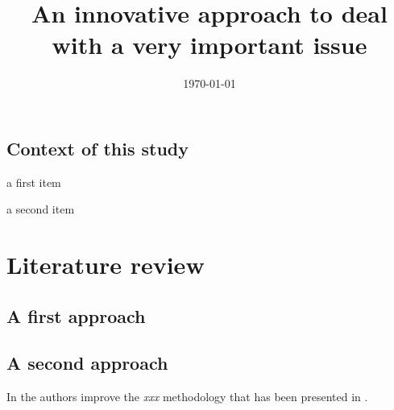 \documentclass{gsemthesis}
\title{An innovative approach to deal with a very important issue}
\date{\today}
\begin{document}
\printcoverpage

\printfrontmatter


\startintroduction 

\lipsum[1]

\section*{Context of this study}
\label{sec:context}

\lipsum[2]
\begin{itemize*}
\item a first item
\item a second item
\end{itemize*}
\lipsum[3-29]



\chapter{Literature review}
\label{ch:lt}

\lipsum[30]

\section{A first approach}

\lipsum[31-50]

\section{A second approach}

\lipsum[51-70]

In \textcite{keyref2} the authors improve the \emph{xxx} methodology that has been presented in \autocite{keyref1}.




\startconclusion

\lipsum[100-111]






\end{document}
